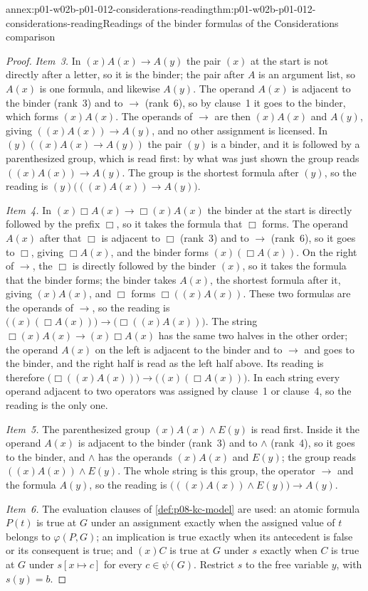 \begin{annexitem}{annex:p01-w02b-p01-012-considerations-reading}{thm:p01-w02b-p01-012-considerations-reading}{Readings of the binder formulas of the Considerations comparison}
\begin{proof}
\emph{Item~3.}  In \((x)A(x)\to A(y)\) the pair \((x)\) at the start is
not directly after a letter, so it is the binder; the pair after \(A\) is
an argument list, so \(A(x)\) is one formula, and likewise \(A(y)\).  The
operand \(A(x)\) is adjacent to the binder (rank~3) and to \(\to\)
(rank~6), so by clause~1 it goes to the binder, which forms \((x)A(x)\).
The operands of \(\to\) are then \((x)A(x)\) and \(A(y)\), giving
\(((x)A(x))\to A(y)\), and no other assignment is licensed.  In
\((y)((x)A(x)\to A(y))\) the pair \((y)\) is a binder, and it is followed
by a parenthesized group, which is read first: by what was just shown the
group reads \(((x)A(x))\to A(y)\).  The group is the shortest formula
after \((y)\), so the reading is \((y)\bigl(((x)A(x))\to A(y)\bigr)\).

\emph{Item~4.}  In \((x)\Box A(x)\to\Box(x)A(x)\) the binder at the start
is directly followed by the prefix \(\Box\), so it takes the formula that
\(\Box\) forms.  The operand \(A(x)\) after that \(\Box\) is adjacent to
\(\Box\) (rank~3) and to \(\to\) (rank~6), so it goes to \(\Box\), giving
\(\Box A(x)\), and the binder forms \((x)(\Box A(x))\).  On the right of
\(\to\), the \(\Box\) is directly followed by the binder \((x)\), so it
takes the formula that the binder forms; the binder takes \(A(x)\), the
shortest formula after it, giving \((x)A(x)\), and \(\Box\) forms
\(\Box((x)A(x))\).  These two formulas are the operands of \(\to\), so the
reading is \(\bigl((x)(\Box A(x))\bigr)\to\bigl(\Box((x)A(x))\bigr)\).  The
string \(\Box(x)A(x)\to(x)\Box A(x)\) has the same two halves in the other
order; the operand \(A(x)\) on the left is adjacent to the binder and to
\(\to\) and goes to the binder, and the right half is read as the left
half above.  Its reading is therefore
\(\bigl(\Box((x)A(x))\bigr)\to\bigl((x)(\Box A(x))\bigr)\).  In each string
every operand adjacent to two operators was assigned by clause~1 or
clause~4, so the reading is the only one.

\emph{Item~5.}  The parenthesized group \((x)A(x)\land E(y)\) is read
first.  Inside it the operand \(A(x)\) is adjacent to the binder (rank~3)
and to \(\land\) (rank~4), so it goes to the binder, and \(\land\) has the
operands \((x)A(x)\) and \(E(y)\); the group reads
\(((x)A(x))\land E(y)\).  The whole string is this group, the operator
\(\to\) and the formula \(A(y)\), so the reading is
\(\bigl(((x)A(x))\land E(y)\bigr)\to A(y)\).

\emph{Item~6.}  The evaluation clauses of \cref{def:p08-kc-model} are
used: an atomic formula \(P(t)\) is true at \(G\) under an assignment
exactly when the assigned value of \(t\) belongs to \(\varphi(P,G)\); an
implication is true exactly when its antecedent is false or its
consequent is true; and \((x)C\) is true at \(G\) under \(s\) exactly when
\(C\) is true at \(G\) under \(s[x\mapsto c]\) for every
\(c\in\psi(G)\).  Restrict \(s\) to the free variable \(y\), with
\(s(y)=b\).


\end{proof}
\end{annexitem}
